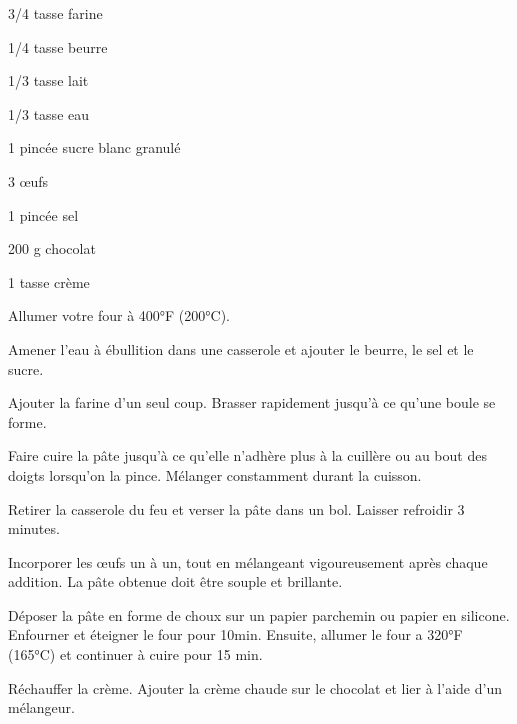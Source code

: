 


\totaltime{}


\begin{ingredients}
    \item[] 
    \item 3/4 tasse farine
    \item 1/4 tasse beurre
    \item 1/3 tasse lait
    \item 1/3 tasse eau
    \item 1 pincée sucre blanc granulé
    \item 3 œufs
    \item 1 pincée sel
    \\
    \item[] 
    \item 200 g chocolat
    \item 1 tasse crème
\end{ingredients}

\begin{steps}
    \item[] 
    \item Allumer votre four à 400°F (200°C).
    \item Amener l'eau à ébullition dans une casserole et ajouter le beurre, le sel et le sucre.
    \item Ajouter la farine d'un seul coup. Brasser rapidement jusqu'à ce qu'une boule se forme.
    \item Faire cuire la pâte jusqu'à ce qu'elle n'adhère plus à la cuillère ou au bout des doigts lorsqu'on la pince. Mélanger constamment durant la cuisson.
    \item Retirer la casserole du feu et verser la pâte dans un bol. Laisser refroidir 3 minutes.
    \item Incorporer les œufs un à un, tout en mélangeant vigoureusement après chaque addition. La pâte obtenue doit être souple et brillante.
    \item Déposer la pâte en forme de choux sur un papier parchemin ou papier en silicone. Enfourner et éteigner le four pour 10min. Ensuite, allumer le four a 320°F (165°C) et continuer à cuire pour 15 min.
    \\
    \item[] 
    \item Réchauffer la crème. Ajouter la crème chaude sur le chocolat et lier à l'aide d'un mélangeur.
\end{steps}
